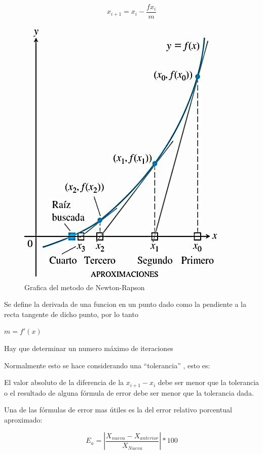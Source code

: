 \documentclass{article}
\begin{document}
\begin{multicols}{2}
\begin{equation}
x_{i+1}=x_{i}-\frac{fx_{i}}{m}
\end{equation}

\begin{figure}[H]
\centering
\includegraphics[scale=.5]{Newton-Rapson}
\caption{Grafica del metodo de Newton-Rapson}
\end{figure}

Se define la derivada de una funcion en un punto dado como la pendiente a la recta tangente de dicho punto, por lo tanto

\begin{center}
$m=f'(x)$
\end{center}
Hay que determinar un numero máximo de iteraciones

Normalmente esto se hace considerando una “tolerancia” , esto es:

El valor absoluto de la diferencia de la $x_{i+1}-x_{i}$ debe ser menor que la tolerancia o el resultado de alguna fórmula de error debe ser menor que la tolerancia dada.

Una de las fórmulas de error mas útiles es la del error relativo porcentual aproximado:

\begin{equation}
E_{a}=|\frac{X_{nueva}-X_{anterior}}{X_{Nueva}}|*100%
\end{equation}


\end{multicols}
\end{document}

